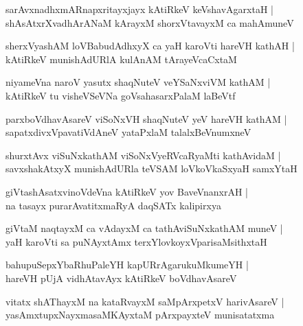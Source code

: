 \documentclass[twoside,12pt,openright]{book}
\newcounter{shloka}[chapter]
\begin{document}
\begin{shloka}%
sarAvxnadhxmARnapxritayxjayx kAtiRkeV keVshavAgarxtaH |\\
shAsAtxrXvadhArANaM kArayxM  shorxVtavayxM ca mahAmuneV 
\end{shloka}

\begin{shloka}%
sherxVyashAM loVBabudAdhxyX ca yaH karoVti hareVH kathAH |\\
kAtiRkeV munishAdURlA kulAnAM tArayeVcaCxtaM 
\end{shloka}

\begin{shloka}%
niyameVna naroV yasutx shaqNuteV veYSaNxviVM kathAM |\\
kAtiRkeV tu visheVSeVNa goVsahasarxPalaM laBeVtf
\end{shloka}

\begin{shloka}%
parxboVdhavAsareV viSoNxVH shaqNuteV yeV hareVH kathAM |\\
sapatxdivxVpavatiVdAneV yataPxlaM talalxBeVnumxneV 
\end{shloka}

\begin{shloka}%
shurxtAvx viSuNxkathAM viSoNxVyeRVcaRyaMti kathAvidaM |\\
savxshakAtxyX munishAdURla teVSAM loVkoVkaSxyaH samxYtaH 
\end{shloka}

\begin{shloka}%
giVtashAsatxvinoVdeVna kAtiRkeV yov BaveVnanxrAH |\\
na tasayx purarAvatitxmaRyA daqSATx kalipirxya
\end{shloka}

\begin{shloka}%
giVtaM naqtayxM ca vAdayxM ca tathAviSuNxkathAM muneV |\\
yaH karoVti sa puNAyxtAmx terxYlovkoyxVparisaMsithxtaH 
\end{shloka}

\begin{shloka}%
bahupuSepxYbaRhuPaleYH kapURrAgarukuMkumeYH |\\
hareVH pUjA vidhAtavAyx kAtiRkeV boVdhavAsareV
\end{shloka}

\begin{shloka}%
vitatx shAThayxM na kataRvayxM saMpArxpetxV harivAsareV |\\
yasAmxtupxNayxmasaMKAyxtaM pArxpayxteV munisatatxma 
\end{shloka}
\end{document}
